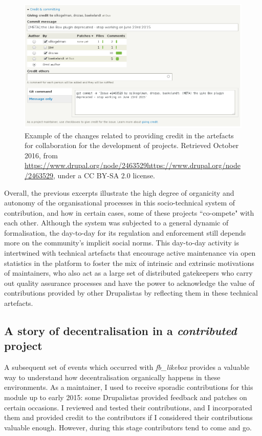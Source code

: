 \begin{figure}[H]
     \centering
   \includegraphics[scale=0.42]{img/online/fb_likebox_providing_credit.png}
    \caption[Providing credit in Facebook Page Plugin]%
        {Example of the changes related to providing credit in the artefacts for collaboration for the development of projects. Retrieved  October 2016, from \url{https://www.drupal.org/node/2463529https://www.drupal.org/node/2463529}, under a CC BY-SA 2.0 license.}
    \label{fb_likebox_credit}
\end{figure}

Overall, the previous excerpts illustrate the high degree of organicity and autonomy of the organisational processes in this socio-technical system of contribution, and how in certain cases, some of these projects ``co-ompete" with each other. Although the system was subjected to a general dynamic of formalisation, the day-to-day for its regulation and enforcement still depends more on the community's implicit social norms. This day-to-day activity is intertwined with technical artefacts that encourage active maintenance via open statistics in the platform to foster the mix of intrinsic and extrinsic motivations of maintainers, who also act as a large set of distributed gatekeepers who carry out quality assurance processes and have the power to acknowledge the value of contributions provided by other Drupalistas by reflecting them in these technical artefacts.

\subsection{A story of decentralisation in a \textit{contributed} project}

A subsequent set of events which occurred with \textit{fb\_likebox} provides a valuable way to understand how decentralisation organically happens in these environments. As a maintainer, I used to receive sporadic contributions for this module up to early 2015: some Drupalistas provided feedback and patches on certain occasions. I reviewed and tested their contributions, and I incorporated them and provided credit to the contributors if I considered their contributions valuable enough. However, during this stage contributors tend to come and go.

